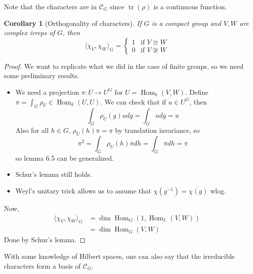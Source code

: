 \documentclass{article}
\theoremstyle{definition}
\theoremstyle{remark}
\theoremstyle{plain}
\newtheorem{crly}[defn]{Corollary}
\newcommand{\CC}{\mathbb{C}}
\newcommand{\Hom}{\operatorname{Hom}}
\begin{document}
Note that the characters are in $\mathcal{C}_G$ since $\operatorname{tr}(\rho)$ is a continuous function.
\begin{crly}[Orthogonality of characters]
    If $G$ is a compact group and $V,W$ are complex irreps of $G$, then
    \[\langle\chi_V,\chi_W\rangle_G=\begin{cases}
        1 & \text{if }V\cong W\\
        0 & \text{if }V\not\cong W
    \end{cases}\]
\end{crly}
\begin{proof}
    We want to replicate what we did in the case of finite groups, so we need some preliminary results.
    \begin{itemize}
        \item We need a projection $\pi:U\to U^G$ for $U=\Hom_k(V,W)$. Define $\pi=\int_G\rho_U\in\Hom_k(U,U)$. We can check that if $u\in U^G$, then
        \[\int_G\rho_U(g)udg=\int_Gudg=u\]
        Also for all $h\in G$, $\rho_U(h)\pi=\pi$ by translation invariance, so
        \[\pi^2=\int_G\rho_U(h)\pi dh=\int_G\pi dh=\pi\]
        so lemma 6.5 can be generalized.
        \item Schur's lemma still holds.
        \item Weyl's unitary trick allows us to assume that $\chi(g^{-1})=\overline{\chi(g)}$ wlog.
    \end{itemize}  
    Now,
    \begin{align*}
        \langle\chi_V,\chi_W\rangle_G&=\dim\Hom_G(1,\Hom_\CC(V,W))\\
        &=\dim\Hom_G(V,W)
    \end{align*}
    Done by Schur's lemma.
\end{proof}

With some knowledge of Hilbert spaces, one can also say that the irreducible characters form a basis of $\mathcal{C}_G$.
\end{document}
